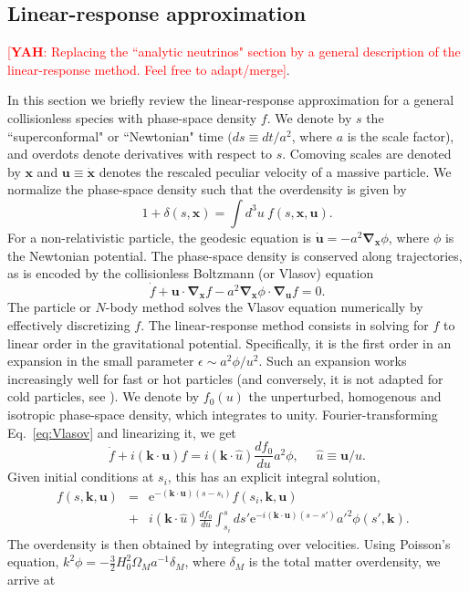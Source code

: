 \documentclass[useAMS, usenatbib]{mnras}
\newcommand{\beq}{\begin{equation}}
\newcommand{\eeq}{\end{equation}}
\newcommand{\barr}{\begin{eqnarray}}
\newcommand{\earr}{\end{eqnarray}}
\newcommand{\rme}{\textrm{e}}
\newcommand{\bs}{\mathbf}
\newcommand{\yah}[1]{{\textcolor{red}{[{\bf YAH}: #1]}}}
\begin{document}
\subsection{Linear-response approximation} \label{sec:analytic}

\yah{Replacing the ``analytic neutrinos" section by a general description of the linear-response method. Feel free to adapt/merge}.


In this section we briefly review the linear-response approximation for a general collisionless species with phase-space density $f$. We denote by $s$ the ``superconformal" or ``Newtonian" time $(ds \equiv dt/a^2$, where $a$ is the scale factor), and overdots denote derivatives with respect to $s$. Comoving scales are denoted by $\bs{x}$ and $\bs{u} \equiv \dot{\bs{x}}$ denotes the rescaled peculiar velocity of a massive particle. We normalize the phase-space density such that the overdensity is given by
\beq
1 + \delta(s, \bs{x}) = \int d^3 u ~ f(s, \bs{x}, \bs{u}).
\eeq
For a non-relativistic particle, the geodesic equation is $\dot{\bs{u}} = - a^2  \bs{\nabla}_{\bs{x}} \phi$, where $\phi$ is the Newtonian potential. The phase-space density is conserved along trajectories, as is encoded by the collisionless Boltzmann (or Vlasov) equation
\beq
\dot{f} + \bs{u} \cdot \bs{\nabla}_{\bs{x}} f - a^2 \bs{\nabla}_{\bs{x}} \phi \cdot \bs{\nabla}_{\bs{u}} f = 0. \label{eq:Vlasov}
\eeq
The particle or $N$-body method solves the Vlasov equation numerically by effectively discretizing $f$. The linear-response method consists in solving for $f$ to linear order in the gravitational potential. Specifically, it is the first order in an expansion in the small parameter $\epsilon \sim a^2 \phi/u^2$. Such an expansion works increasingly well for fast or hot particles (and conversely, it is not adapted for cold particles, see \citealt{YAH_15}). We denote by $f_0(u)$ the unperturbed, homogenous and isotropic phase-space density, which integrates to unity. Fourier-transforming Eq.~\eqref{eq:Vlasov} and linearizing it, we get
\beq
\dot{f} + i (\bs{k} \cdot \bs{u}) f = i (\bs{k} \cdot  \hat{u}) \frac{d f_0}{du} a^2 \phi ,  \ \ \ \ \ \ \hat{u} \equiv \bs{u}/u.
\eeq 
Given initial conditions at $s_i$, this has an explicit integral solution,
\barr
f(s, \bs{k}, \bs{u}) &=& \rme^{- (\bs{k} \cdot \bs{u}) (s - s_i)} f(s_i, \bs{k}, \bs{u}) \nonumber\\
&+& i (\bs{k} \cdot  \hat{u}) \frac{d f_0}{du} \int_{s_i}^s d s' \rme^{- i(\bs{k} \cdot \bs{u}) (s - s')} a'^2 \phi(s', \bs{k}).~~~
\earr
The overdensity is then obtained by integrating over velocities. Using Poisson's equation, $k^2 \phi = - \frac32 H_0^2 \Omega_M a^{-1} \delta_M$, where $\delta_M$ is the total matter overdensity, we arrive at
\end{document}
